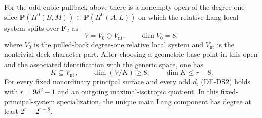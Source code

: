 \begin{proposition}
\label{prop:DE-Lang-deck-slice-quotient-eight}
For the odd cubic pullback above there is a nonempty open of the
degree-one slice \(\mathbf P(H^0(B,M))\subset\mathbf P(H^0(A,L))\)
on which the relative Lang local system splits over \(\mathbf F_2\)
as
\[
                 V=V_0\oplus V_{\mathrm{nt}},\qquad
                 \dim V_0=8,
 \tag{DE-DS1}
\]
where \(V_0\) is the pulled-back degree-one relative local system
and \(V_{\mathrm{nt}}\) is the nontrivial deck-character part.
After choosing a geometric base point in this open and the associated
identification with the generic space, one has
\[
 K\subseteq V_{\mathrm{nt}},\qquad
 \dim(V/K)\geq8,\qquad \dim K\leq r-8.
 \tag{DE-DS2}
\]
For every fixed nonordinary principal surface and every odd \(d\),
(DE-DS2) holds with \(r=9d^2-1\) and an outgoing maximal-isotropic
quotient. In this fixed-principal-system specialization, the unique
main Lang component has degree at least \(2^r-2^{r-8}\).
\end{proposition}
